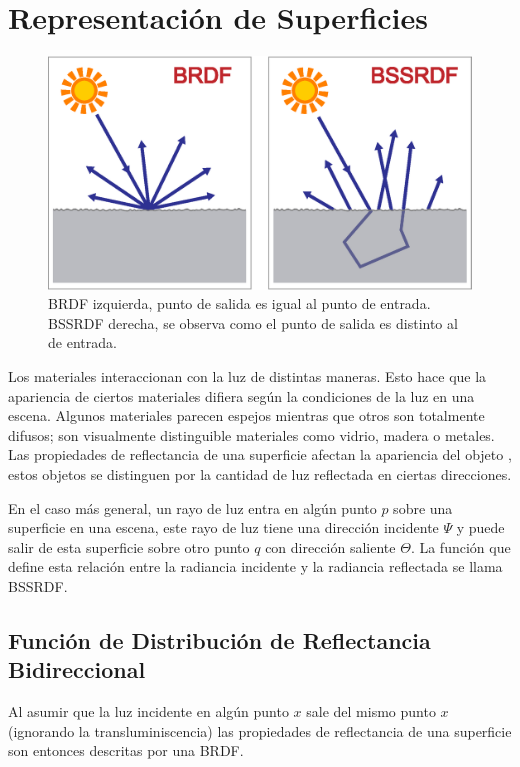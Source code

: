\section{Representación de Superficies}
\label{sec:surface_rep}

\begin{figure}
	\includegraphics[width=\linewidth]{media/brdf_vs.eps}
	\caption
	{
    	\ac{BRDF} izquierda, punto de salida es igual al punto de entrada.\\ 
    	\ac{BSSRDF} derecha, se observa como el punto de salida es distinto al de entrada.
	}
	\label{fig:bssrdf}
\end{figure}

Los materiales interaccionan con la luz de distintas maneras. Esto hace que la apariencia de ciertos materiales difiera según la condiciones de la luz en una escena. Algunos materiales parecen espejos mientras que otros son totalmente difusos; son visualmente distinguible materiales como vidrio, madera o metales. Las propiedades de reflectancia de una superficie afectan la apariencia del objeto \cite{advanced_gi2006}, estos objetos se distinguen por la cantidad de luz reflectada en ciertas direcciones. 

En el caso más general, un rayo de luz entra en algún punto $p$ sobre una superficie en una escena, este rayo de luz tiene una dirección incidente $\Psi$ y puede salir de esta superficie sobre otro punto $q$ con dirección saliente $\Theta$. La función que define esta relación entre la radiancia incidente y la radiancia reflectada se llama \ac{BSSRDF}.

\subsection{Función de Distribución de Reflectancia Bidireccional}
Al asumir que la luz incidente en algún punto $x$ sale del mismo punto $x$ (ignorando la transluminiscencia) las propiedades de reflectancia de una superficie son entonces descritas por una \ac{BRDF}.

